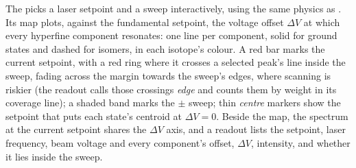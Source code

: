 The  picks a laser setpoint and a sweep
interactively, using the same physics as . Its map
plots, against the fundamental setpoint, the voltage offset $\Delta V$
at which every hyperfine component resonates: one line per component,
solid for ground states and dashed for isomers, in each isotope's
colour. A red bar marks the current setpoint, with a red ring where it
crosses a selected peak's line inside the sweep, fading across the
margin towards the sweep's edges, where scanning is riskier (the readout
calls those crossings \emph{edge} and counts them by weight in its
coverage line); a shaded band marks the $\pm$ sweep; thin
\emph{centre} markers show the setpoint that puts each state's centroid
at $\Delta V = 0$. Beside the map, the spectrum at the current setpoint
shares the $\Delta V$ axis, and a readout lists the setpoint, laser
frequency, beam voltage and every component's offset, $\Delta V$,
intensity, and whether it lies inside the sweep.

